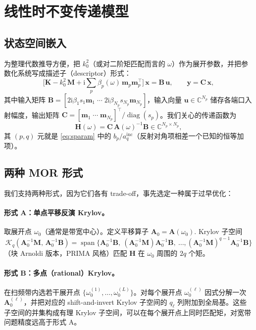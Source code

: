 \documentclass[11pt,a4paper]{ctexart}
\newcommand{\C}{\mathbb{C}}
\newcommand{\im}{\mathrm{i}}
\DeclareMathOperator{\diag}{diag}
\DeclareMathOperator{\spanop}{span}
\begin{document}
\section{线性时不变传递模型}

\subsection{状态空间嵌入}

为整理代数推导方便，把 $k_0^2$（或对二阶矩匹配而言的 $\omega$）作为展开参数，并把参数化系统写成描述子（descriptor）形式：
\begin{equation}
  \big[\bm K - k_0^2\,\bm M + \im\sum_p \beta_p(\omega)\,\bm m_p\bm m_p^{\!\top}\big]\,
  \bm x = \bm B\,\bm u,
  \qquad \bm y = \bm C\,\bm x,
  \label{eq:lti}
\end{equation}
其中输入矩阵 $\bm B = [2\im\beta_1 s_1 \bm m_1\;\cdots\;2\im\beta_{N_p} s_{N_p}\bm m_{N_p}]$，输入向量 $\bm u\in\C^{N_p}$ 储存各端口入射幅度，输出矩阵 $\bm C = [\bm m_1\;\cdots\;\bm m_{N_p}]^{\!\top}/\diag(s_p)$。我们关心的传递函数为
\begin{equation}
  \bm H(\omega) = \bm C\,\bm A(\omega)^{-1}\bm B \in \C^{N_p\times N_p},
\end{equation}
其 $(p,q)$ 元就是 \eqref{eq:sparam} 中的 $b_p/a_q^{\mathrm{inc}}$（反射对角项相差一个已知的恒等加项）。

\subsection{两种 MOR 形式}

我们支持两种形式，因为它们各有 trade-off，事先选定一种属于过早优化：

\paragraph{形式 A：单点平移反演 Krylov。}
取展开点 $\omega_0$（通常是带宽中心）。定义平移算子
\(
  \bm A_0 = \bm A(\omega_0).
\)
Krylov 子空间
\begin{equation}
  \mathcal{K}_q(\bm A_0^{-1}\bm M,\,\bm A_0^{-1}\bm B)
  = \spanop\!\big\{\bm A_0^{-1}\bm B,\ (\bm A_0^{-1}\bm M)\bm A_0^{-1}\bm B,\ \ldots,
                    (\bm A_0^{-1}\bm M)^{q-1}\bm A_0^{-1}\bm B\big\}
  \label{eq:krylov-singlepoint}
\end{equation}
（块 Arnoldi 版本，PRIMA 风格）匹配 $\bm H$ 在 $\omega_0$ 周围的 $2q$ 个矩。

\paragraph{形式 B：多点（rational）Krylov。}
在扫频带内选若干展开点 $\{\omega_0^{(1)},\dots,\omega_0^{(L)}\}$。对每个展开点 $\omega_0^{(\ell)}$ 因式分解一次 $\bm A_0^{(\ell)}$，并把对应的 shift-and-invert Krylov 子空间的 $q_\ell$ 列附加到全局基。这些子空间的并集构成有理 Krylov 子空间，可以在每个展开点上同时匹配矩，对宽带问题精度远高于形式 A。
\end{document}
